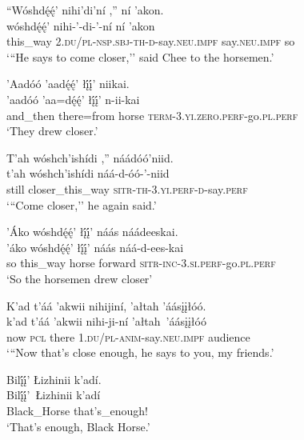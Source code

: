 \ea\label{ex:text1-66-12}
``Wóshdę́ę́’ nihi’di’ní ,'' ní ’akon.\\
\gll wóshdę́ę́’	nihi-’-di-’-ní	ní	’akon\\
     this\_way	2.\textsc{du}/\textsc{pl}-\textsc{nsp}.\textsc{sbj}-\textsc{th}-\textsc{d}-say.\textsc{neu}.\textsc{impf}	say.\textsc{neu}.\textsc{impf}	so\\
\glt `{``}He says to come closer,'' said Chee to the horsemen.'
\z

\ea\label{ex:text1-66-13}
’Aadóó ’aadę́ę́’ łį́į́’ niikai.\\
\gll ’aadóó	’aa=dę́ę́’	łį́į́’	n-ii-kai\\
     and\_then	there=from	horse	\textsc{term}-3.\textsc{yi}.\textsc{zero}.\textsc{perf}-go.\textsc{pl}.\textsc{perf}\\
\glt `They drew closer.'
\z

\ea\label{ex:text1-66-14}
T’ah wóshch’ishídi ,'' náádóó’niid.\\
\gll t’ah	wóshch’ishídi	náá-d-óó-’-niid\\
     still	closer\_this\_way	\textsc{sitr}-\textsc{th}-3.\textsc{yi}.\textsc{perf}-\textsc{d}-say.\textsc{perf}\\
\glt `{``}Come closer,'' he again said.'
\z

\ea\label{ex:text1-66-15}
’Áko wóshdę́ę́’ łį́į́’ náás náádeeskai.\\
\gll ’áko	wóshdę́ę́’	łį́į́’	náás	náá-d-ees-kai\\
     so	this\_way	horse	forward	\textsc{sitr}-\textsc{inc}-3.\textsc{si}.\textsc{perf}-go.\textsc{pl}.\textsc{perf}\\
\glt `So the horsemen drew closer'
\z

\ea\label{ex:text1-66-16}
K’ad t’áá ’akwii nihijiní, ’ałtah ’áásįįłóó.\\
\gll k’ad	t’áá	’akwii	nihi-ji-ní	’ałtah~{’áásįįłóó}\\
     now	\textsc{pcl}	there	1.\textsc{du}/\textsc{pl}-\textsc{anim}-say.\textsc{neu}.\textsc{impf}	audience\\
\glt `{``}Now that's close enough, he says to you, my friends.'
\z

\ea\label{ex:text1-66-17}
Bilį́į́’ Łizhinii k’adí.\\
\gll Bilį́į́’~{Łizhinii}	k’adí\\
     Black\_Horse	that's\_enough!\\
\glt `That's enough, Black Horse.'
\z

